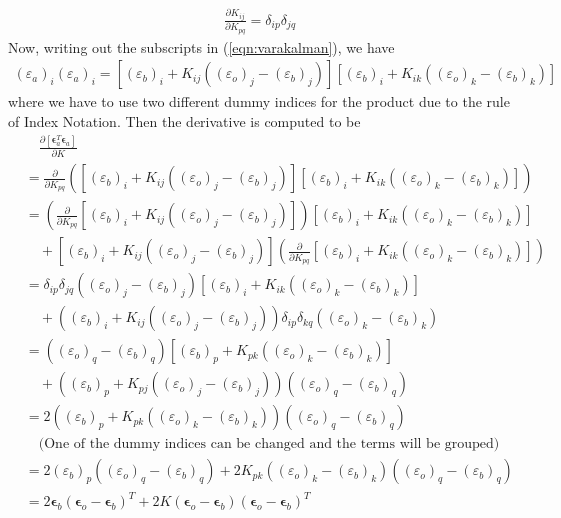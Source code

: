 \begin{align}
\frac{\partial K_{ij}}{\partial K_{pq}} = \delta_{ip}\delta_{jq}
\end{align}
Now, writing out the subscripts in (\ref{eqn:varakalman}), we have
\begin{align}
(\varepsilon_a)_i(\varepsilon_a)_i = [(\varepsilon_b)_i + K_{ij}((\varepsilon_o)_j - (\varepsilon_b)_j)][(\varepsilon_b)_i + K_{ik}((\varepsilon_o)_k - (\varepsilon_b)_k)]
\end{align}
where we have to use two different dummy indices for the product due to the rule of Index Notation. Then the derivative is computed to be
\begin{align}
&\quad \frac{\partial [\bm{\epsilon}_a^T\bm{\epsilon}_a]}{\partial K} \nonumber \\
&= \frac{\partial}{\partial K_{pq}}\left([(\varepsilon_b)_i + K_{ij}((\varepsilon_o)_j - (\varepsilon_b)_j)][(\varepsilon_b)_i + K_{ik}((\varepsilon_o)_k - (\varepsilon_b)_k)]\right) \nonumber \\
&= \left(\frac{\partial}{\partial K_{pq}}[(\varepsilon_b)_i + K_{ij}((\varepsilon_o)_j - (\varepsilon_b)_j)]\right)[(\varepsilon_b)_i + K_{ik}((\varepsilon_o)_k - (\varepsilon_b)_k)] \nonumber \\
&\quad +[(\varepsilon_b)_i + K_{ij}((\varepsilon_o)_j - (\varepsilon_b)_j)] \left(\frac{\partial}{\partial K_{pq}}[(\varepsilon_b)_i + K_{ik}((\varepsilon_o)_k - (\varepsilon_b)_k)]\right) \nonumber \\
&= \delta_{ip}\delta_{jq}((\varepsilon_o)_j - (\varepsilon_b)_j)[(\varepsilon_b)_i + K_{ik}((\varepsilon_o)_k - (\varepsilon_b)_k)] \nonumber \\
&\quad + ((\varepsilon_b)_i + K_{ij}((\varepsilon_o)_j - (\varepsilon_b)_j)) \delta_{ip}\delta_{kq} ((\varepsilon_o)_k - (\varepsilon_b)_k) \nonumber \\
&= ((\varepsilon_o)_q - (\varepsilon_b)_q)[(\varepsilon_b)_p + K_{pk}((\varepsilon_o)_k - (\varepsilon_b)_k)] \nonumber \\
&\quad + ((\varepsilon_b)_p + K_{pj}((\varepsilon_o)_j - (\varepsilon_b)_j)) ((\varepsilon_o)_q - (\varepsilon_b)_q) \nonumber \\
&= 2((\varepsilon_b)_p + K_{pk}((\varepsilon_o)_k - (\varepsilon_b)_k)) ((\varepsilon_o)_q - (\varepsilon_b)_q) \nonumber \\
&\quad \text{(One of the dummy indices can be changed and the terms will be grouped)} \nonumber \\
&= 2(\varepsilon_b)_p ((\varepsilon_o)_q - (\varepsilon_b)_q) + 2 K_{pk}((\varepsilon_o)_k - (\varepsilon_b)_k)((\varepsilon_o)_q - (\varepsilon_b)_q) \nonumber \\
&= 2 \bm{\epsilon}_b (\bm{\epsilon}_o - \bm{\epsilon}_b)^T + 2K(\bm{\epsilon}_o - \bm{\epsilon}_b)(\bm{\epsilon}_o - \bm{\epsilon}_b)^T \label{eqn:Kalmande0res}
\end{align}
